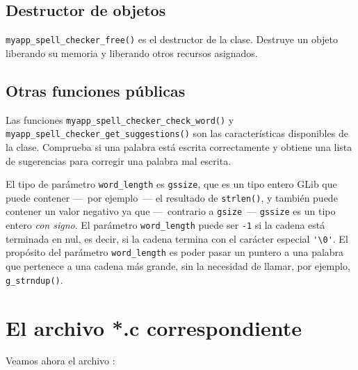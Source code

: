 
\subsection{Destructor de objetos}
\lstinline{myapp_spell_checker_free()} es el destructor de la clase. Destruye un objeto liberando su memoria y liberando otros recursos asignados.

\subsection{Otras funciones públicas}
Las funciones \lstinline{myapp_spell_checker_check_word()} y \lstinline{myapp_spell_checker_get_suggestions()} son las características disponibles de la clase. Comprueba si una palabra está escrita correctamente y obtiene una lista de sugerencias para corregir una palabra mal escrita.

El tipo de parámetro \lstinline{word_length} es \lstinline{gssize}, que es un tipo entero GLib que puede contener ---~por ejemplo~--- el resultado de \lstinline{strlen()}, y también puede contener un valor negativo ya que ---~contrario a \lstinline{gsize}~--- \lstinline {gssize} es un tipo entero \emph{con signo}. El parámetro \lstinline{word_length} puede ser \lstinline{-1} si la cadena está terminada en nul, es decir, si la cadena termina con el carácter especial \lstinline{'\0'}. El propósito del parámetro \lstinline{word_length} es poder pasar un puntero a una palabra que pertenece a una cadena más grande, sin la necesidad de llamar, por ejemplo, \lstinline{g_strndup()}.

\section{El archivo *.c correspondiente}

Veamos ahora el archivo :

\vspace{0.7cm}


